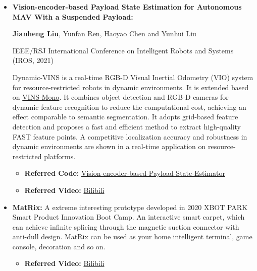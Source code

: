 \documentclass[11pt,a4paper,sans]{moderncv}        %
\begin{document}
{\begin{itemize}
\begin{itemize}
\item \textbf{Referred Code:} \href{https://github.com/jianhengLiu/VINS-RGBD-FAST}{VINS-RGBD-FAST}.
\end{itemize}
\vspace{6pt}

\item \textbf{Vision-encoder-based Payload State Estimation for Autonomous MAV With a Suspended Payload:} 

\textbf{Jianheng Liu}, Yunfan Ren, Haoyao Chen and Yunhui Liu

IEEE/RSJ International Conference on Intelligent Robots and Systems (IROS, 2021)

Dynamic-VINS is a real-time RGB-D Visual Inertial Odometry (VIO) system for resource-restricted robots in dynamic environments. It is extended based on \href{https://github.com/HKUST-Aerial-Robotics/VINS-Mono}{VINS-Mono}. It combines object detection and RGB-D cameras for dynamic feature recognition to reduce the computational cost, achieving an effect comparable to semantic segmentation. It adopts grid-based feature detection and proposes a fast and efficient method to extract high-quality FAST feature points. A competitive localization accuracy and robustness in dynamic environments are shown in a real-time application on  resource-restricted platforms. 

\begin{itemize}
\item \textbf{Referred Code:} \href{https://github.com/jianhengLiu/Vision-encoder-based-Payload-State-Estimator}{Vision-encoder-based-Payload-State-Estimator}
\item \textbf{Referred Video:} \href{https://www.bilibili.com/video/BV1Qq4y1U7n4?share_source=copy_web}{Bilibili}
\end{itemize}
\vspace{6pt}

\item \textbf{MatRix:} A extreme interesting prototype developed in 2020 XBOT PARK Smart Product Innovation Boot Camp. An interactive smart carpet, which can achieve infinite splicing through the magnetic suction connector with anti-dull design. MatRix can be used as your home intelligent terminal, game console, decoration and so on.

\begin{itemize}
\item \textbf{Referred Video:} \href{https://www.bilibili.com/video/BV1gb4y127by?share_source=copy_web}{Bilibili}
\end{itemize}


\end{itemize}}
\end{document}
